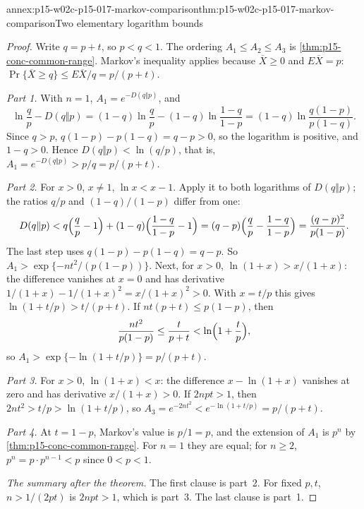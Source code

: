 \begin{annexitem}{annex:p15-w02c-p15-017-markov-comparison}{thm:p15-w02c-p15-017-markov-comparison}{Two elementary logarithm bounds}
\begin{proof}
Write \(q=p+t\), so \(p<q<1\). The ordering \(A_1\leq A_2\leq A_3\) is
\cref{thm:p15-conc-common-range}. Markov's inequality applies because
\(\overline X\geq0\) and \(E\overline X=p\):
\(\Pr\{\overline X\geq q\}\leq E\overline X/q=p/(p+t)\).

\emph{Part 1.} With \(n=1\), \(A_1=e^{-D(q\Vert p)}\), and
\[
 \ln\frac qp-D(q\Vert p)
 =(1-q)\ln\frac qp-(1-q)\ln\frac{1-q}{1-p}
 =(1-q)\ln\frac{q(1-p)}{p(1-q)} .
\]
Since \(q>p\), \(q(1-p)-p(1-q)=q-p>0\), so the logarithm is positive, and
\(1-q>0\). Hence \(D(q\Vert p)<\ln(q/p)\), that is,
\(A_1=e^{-D(q\Vert p)}>p/q=p/(p+t)\).

\emph{Part 2.} For \(x>0\), \(x\neq1\), \(\ln x<x-1\). Apply it to both
logarithms of \(D(q\Vert p)\); the ratios \(q/p\) and \((1-q)/(1-p)\)
differ from one:
\[
 D(q\Vert p)<q\Bigl(\frac qp-1\Bigr)+(1-q)\Bigl(\frac{1-q}{1-p}-1\Bigr)
 =(q-p)\Bigl(\frac qp-\frac{1-q}{1-p}\Bigr)
 =\frac{(q-p)^2}{p(1-p)} .
\]
The last step uses \(q(1-p)-p(1-q)=q-p\). So
\(A_1>\exp\{-nt^2/(p(1-p))\}\). Next, for \(x>0\),
\(\ln(1+x)>x/(1+x)\): the difference vanishes at \(x=0\) and has
derivative \(1/(1+x)-1/(1+x)^2=x/(1+x)^2>0\). With \(x=t/p\) this gives
\(\ln(1+t/p)>t/(p+t)\). If \(nt(p+t)\leq p(1-p)\), then
\[
 \frac{nt^2}{p(1-p)}\leq\frac t{p+t}<\ln\Bigl(1+\frac tp\Bigr),
\]
so \(A_1>\exp\{-\ln(1+t/p)\}=p/(p+t)\).

\emph{Part 3.} For \(x>0\), \(\ln(1+x)<x\): the difference
\(x-\ln(1+x)\) vanishes at zero and has derivative \(x/(1+x)>0\). If
\(2npt>1\), then \(2nt^2>t/p>\ln(1+t/p)\), so
\(A_3=e^{-2nt^2}<e^{-\ln(1+t/p)}=p/(p+t)\).

\emph{Part 4.} At \(t=1-p\), Markov's value is \(p/1=p\), and the
extension of \(A_1\) is \(p^n\) by \cref{thm:p15-conc-common-range}. For
\(n=1\) they are equal; for \(n\geq2\), \(p^n=p\cdot p^{n-1}<p\) since
\(0<p<1\).

\emph{The summary after the theorem.} The first clause is part~2. For
fixed \(p,t\), \(n>1/(2pt)\) is \(2npt>1\), which is part~3. The last
clause is part~1.


\end{proof}
\end{annexitem}
